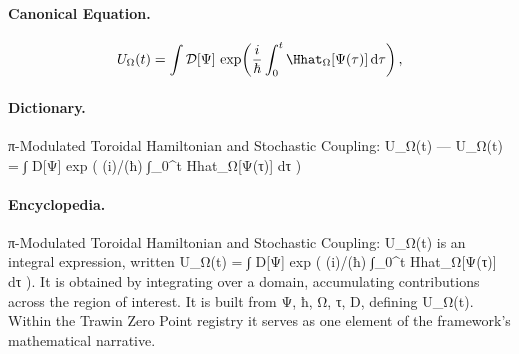 \paragraph{Canonical Equation.}
\[
U_{\Omega}(t) = \int \mathcal{D}[\Psi]\, \exp\!\left( \frac{i}{\hbar} \int_0^t \Hhat_{\Omega}[\Psi(\tau)]\,\mathrm{d}\tau \right),
\]

\paragraph{Dictionary.}
π-Modulated Toroidal Hamiltonian and Stochastic Coupling: U\_Ω(t) — U\_Ω(t) = ∫ D[Ψ] exp ( (i)/(ħ) ∫\_0\textasciicircum{}t Hhat\_Ω[Ψ(τ)] dτ )

\paragraph{Encyclopedia.}
π-Modulated Toroidal Hamiltonian and Stochastic Coupling: U\_Ω(t) is an integral expression, written U\_Ω(t) = ∫ D[Ψ] exp ( (i)/(ħ) ∫\_0\textasciicircum{}t Hhat\_Ω[Ψ(τ)] dτ ). It is obtained by integrating over a domain, accumulating contributions across the region of interest. It is built from Ψ, ħ, Ω, τ, D, defining U\_Ω(t). Within the Trawin Zero Point registry it serves as one element of the framework's mathematical narrative.

